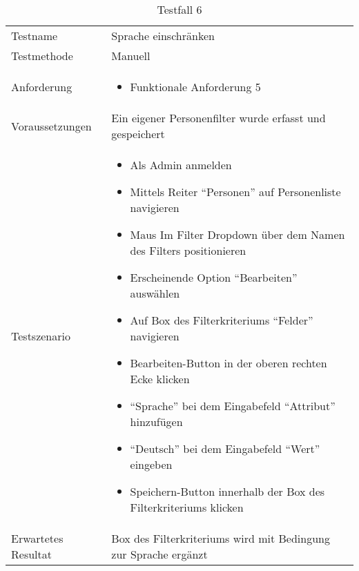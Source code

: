 \begin{table}[h!]
   \begin{tabular}{|L{0.4\textwidth}|L{0.6\textwidth}|}
       \hline
         \\[12pt]
       \hline
        Testname & Sprache einschränken \\
       \hline
       Testmethode & Manuell \\
       \hline
        Anforderung & 
        \begin{itemize}
         \item Funktionale Anforderung 5
         \end{itemize}  \\
       \hline
       Voraussetzungen & Ein eigener Personenfilter wurde erfasst und gespeichert \\
       \hline
       Testszenario & 
       \begin{itemize}
         \item Als Admin anmelden
         \item Mittels Reiter ``Personen'' auf Personenliste navigieren
         \item Maus Im Filter Dropdown über dem Namen des Filters positionieren
         \item Erscheinende Option ``Bearbeiten'' auswählen
         \item Auf Box des Filterkriteriums ``Felder'' navigieren
         \item Bearbeiten-Button in der oberen rechten Ecke klicken
         \item ``Sprache'' bei dem Eingabefeld ``Attribut'' hinzufügen
         \item ``Deutsch'' bei dem Eingabefeld ``Wert'' eingeben
         \item Speichern-Button innerhalb der Box des Filterkriteriums klicken
       \end{itemize} \\
       \hline
       Erwartetes Resultat & Box des Filterkriteriums wird mit Bedingung zur Sprache ergänzt \\
     \hline
     \end{tabular}
     \caption{Testfall 6}
\end{table}

\newpage

